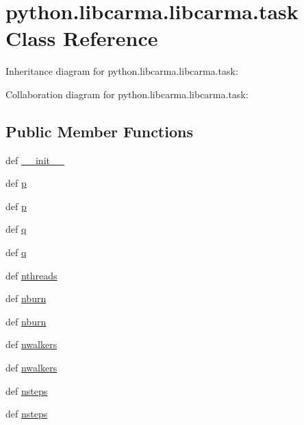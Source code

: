 \hypertarget{classpython_1_1libcarma_1_1libcarma_1_1task}{\section{python.\-libcarma.\-libcarma.\-task Class Reference}
\label{classpython_1_1libcarma_1_1libcarma_1_1task}
}


Inheritance diagram for python.\-libcarma.\-libcarma.\-task\-:


Collaboration diagram for python.\-libcarma.\-libcarma.\-task\-:
\subsection*{Public Member Functions}
\begin{DoxyCompactItemize}
\item 
def \hyperlink{classpython_1_1libcarma_1_1libcarma_1_1task_a56a77b3fb1dc1cfc7755f3a393351ce6}{\-\_\-\-\_\-init\-\_\-\-\_\-}
\item 
def \hyperlink{classpython_1_1libcarma_1_1libcarma_1_1task_a94744fa39163415ffcaf0d62d40fca0a}{p}
\item 
def \hyperlink{classpython_1_1libcarma_1_1libcarma_1_1task_a94744fa39163415ffcaf0d62d40fca0a}{p}
\item 
def \hyperlink{classpython_1_1libcarma_1_1libcarma_1_1task_aa81a6ec3a0273a08b157673c847dbfd7}{q}
\item 
def \hyperlink{classpython_1_1libcarma_1_1libcarma_1_1task_aa81a6ec3a0273a08b157673c847dbfd7}{q}
\item 
def \hyperlink{classpython_1_1libcarma_1_1libcarma_1_1task_a6e635f95fe65a97b184579c9f541ddd5}{nthreads}
\item 
def \hyperlink{classpython_1_1libcarma_1_1libcarma_1_1task_a5583472b31550f268e3290ec4c3ad7af}{nburn}
\item 
def \hyperlink{classpython_1_1libcarma_1_1libcarma_1_1task_a5583472b31550f268e3290ec4c3ad7af}{nburn}
\item 
def \hyperlink{classpython_1_1libcarma_1_1libcarma_1_1task_a136998a257bc82c4df663d46871a7f51}{nwalkers}
\item 
def \hyperlink{classpython_1_1libcarma_1_1libcarma_1_1task_a136998a257bc82c4df663d46871a7f51}{nwalkers}
\item 
def \hyperlink{classpython_1_1libcarma_1_1libcarma_1_1task_af6f36241731b24af9e6872106f2d6eab}{nsteps}
\item 
def \hyperlink{classpython_1_1libcarma_1_1libcarma_1_1task_af6f36241731b24af9e6872106f2d6eab}{nsteps}

\end{DoxyCompactItemize}
